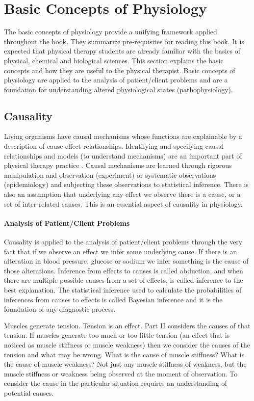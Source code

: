 \section{Basic Concepts of  Physiology}

The basic concepts of physiology provide a unifying framework applied throughout the book. They summarize pre-requisites for reading this book. It is expected that physical therapy students are already familiar with the basics of physical, chemical and biological sciences. This section explains the basic concepts and how they are useful to the physical therapist. Basic concepts of physiology are applied to the analysis of patient/client problems and are a foundation for understanding altered physiological states (pathophysiology).

\subsection{Causality}
Living organisms have causal mechanisms whose functions are explainable by a description of cause-effect relationships. Identifying and specifying causal relationships and models (to understand mechanisms) are an important part of physical therapy practice \cite{collins_synthesis_2018}. Causal mechanisms are learned through rigorous manipulation and observation (experiment) or systematic observations (epidemiology) and subjecting these observations to statistical inference. There is also an assumption that underlying any effect we observe there is a cause, or a set of inter-related causes. This is an essential aspect of causality in physiology.

\paragraph{Analysis of Patient/Client Problems}
Causality is applied to the analysis of patient/client problems through the very fact that if we observe an effect we infer some underlying cause. If there is an alteration in blood pressure, glucose or sodium we infer something is the cause of those alterations. Inference from effects to causes is called abduction, and when there are multiple possible causes from a set of effects, is called inference to the best explanation. The statistical inference used to calculate the probabilities of inferences from causes to effects is called Bayesian inference and it is the foundation of any diagnostic process. 

Muscles generate tension. Tension is an effect. Part II considers the causes of that tension. If muscles generate too much or too little tension (an effect that is noticed as muscle stiffness or muscle weakness) then we consider the causes of the tension and what may be wrong. What is the cause of muscle stiffness? What is the cause of muscle weakness? Not just any muscle stiffness of weakness, but the muscle stiffness or weakness being observed at the moment of observation. To consider the cause in the particular situation requires an understanding of potential causes.


